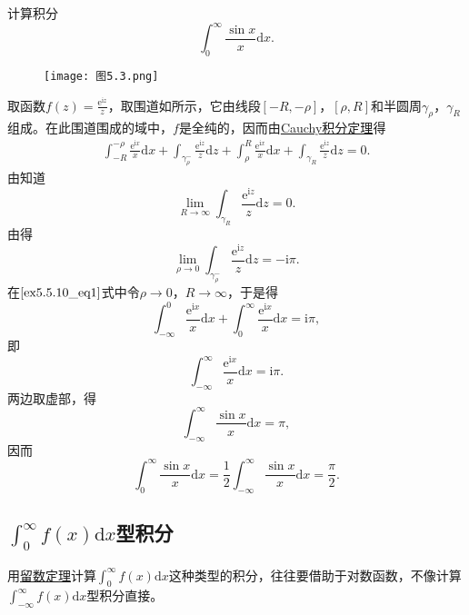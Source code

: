\documentclass[../../main.tex]{subfiles}
\begin{document}
\begin{example}
计算积分
\[
\int_{0}^{\infty} \frac{\sin x}{x} \mathrm{d}x.
\]
\end{example}
\begin{figure}[H]
\centering
\texttt{[image: 图5.3.png]}
\caption{}
\label{figure:图5.3}
\end{figure}
\begin{solution}
取函数\( f(z) = \frac{\mathrm{e}^{\mathrm{i}z}}{z} \)，取围道如所示，它由线段\([-R, -\rho]\)，\([\rho, R]\)和半圆周\(\gamma_{\rho}\)，\(\gamma_R\)组成。在此围道围成的域中，\( f \)是全纯的，因而由\hyperref[theorem:Cauchy-Goursat定理(Cauchy积分定理)]{Cauchy积分定理}得
\begin{align}
\int_{-R}^{-\rho} \frac{\mathrm{e}^{\mathrm{i}x}}{x} \mathrm{d}x + \int_{\gamma_{\rho}^{-}} \frac{\mathrm{e}^{\mathrm{i}z}}{z} \mathrm{d}z + \int_{\rho}^{R} \frac{\mathrm{e}^{\mathrm{i}x}}{x} \mathrm{d}x + \int_{\gamma_R} \frac{\mathrm{e}^{\mathrm{i}z}}{z} \mathrm{d}z = 0. \label{ex5.5.10_eq1}
\end{align}
由知道
\[
\lim_{R \to \infty} \int_{\gamma_R} \frac{\mathrm{e}^{\mathrm{i}z}}{z} \mathrm{d}z = 0.
\]
由得
\[
\lim_{\rho \to 0} \int_{\gamma_{\rho}^{-}} \frac{\mathrm{e}^{\mathrm{i}z}}{z} \mathrm{d}z = -\mathrm{i}\pi.
\]
在\(\eqref{ex5.5.10_eq1}\)式中令\(\rho \to 0\)，\( R \to \infty \)，于是得
\[
\int_{-\infty}^{0} \frac{\mathrm{e}^{\mathrm{i}x}}{x} \mathrm{d}x + \int_{0}^{\infty} \frac{\mathrm{e}^{\mathrm{i}x}}{x} \mathrm{d}x = \mathrm{i}\pi,
\]
即
\[
\int_{-\infty}^{\infty} \frac{\mathrm{e}^{\mathrm{i}x}}{x} \mathrm{d}x = \mathrm{i}\pi.
\]
两边取虚部，得
\[
\int_{-\infty}^{\infty} \frac{\sin x}{x} \mathrm{d}x = \pi,
\]
因而
\[
\int_{0}^{\infty} \frac{\sin x}{x} \mathrm{d}x = \frac{1}{2} \int_{-\infty}^{\infty} \frac{\sin x}{x} \mathrm{d}x
= \frac{\pi}{2}.
\]

\end{solution}

\subsection{$\int_0^{\infty}{f\left( x \right) \mathrm{d}x}$型积分}

用\hyperref[theorem:留数定理(残数定理)-定理5.4.9]{留数定理}计算\(\int_{0}^{\infty} f(x) \mathrm{d}x\)这种类型的积分，往往要借助于对数函数，不像计算\(\int_{-\infty}^{\infty} f(x) \mathrm{d}x\)型积分直接。
\end{document}

